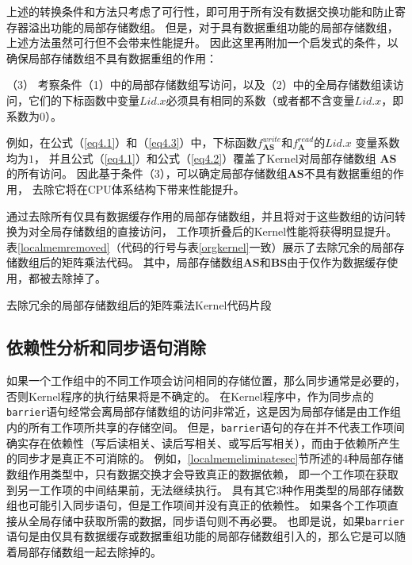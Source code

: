 上述的转换条件和方法只考虑了可行性，即可用于所有没有数据交换功能和防止寄存器溢出功能的局部存储数组。
但是，对于具有数据重组功能的局部存储数组，上述方法虽然可行但不会带来性能提升。
因此这里再附加一个启发式的条件，以确保局部存储数组不具有数据重组的作用：
\begin{compactitem}
\item[（3）]{考察条件（1）中的局部存储数组写访问，以及（2）中的全局存储数组读访问，它们的下标函数中变量$Lid.x$必须具有相同的系数（或者都不含变量$Lid.x$，即系数为$0$）。}
\end{compactitem}
例如，在公式（\ref{eq4.1}）和（\ref{eq4.3}）中，下标函数$f^{write}_{\bm{AS}}$和$f^{read}_{\bm{A}}$的$Lid.x$ 变量系数均为$1$，
并且公式（\ref{eq4.1}）和公式（\ref{eq4.2}）覆盖了Kernel对局部存储数组 $\bm{AS}$的所有访问。
因此基于条件（3），可以确定局部存储数组$\bm{AS}$不具有数据重组的作用，
去除它将在CPU体系结构下带来性能提升。

通过去除所有仅具有数据缓存作用的局部存储数组，并且将对于这些数组的访问转换为对全局存储数组的直接访问，
工作项折叠后的Kernel性能将获得明显提升。
表\ref{localmemremoved}（代码的行号与表\ref{orgkernel}一致）展示了去除冗余的局部存储数组后的矩阵乘法代码。
其中，局部存储数组$\bm{AS}$和$\bm{BS}$由于仅作为数据缓存使用，都被去除掉了。

\begin{table}[htb]
\centering
\caption{去除冗余的局部存储数组后的矩阵乘法Kernel代码片段}
\label{localmemremoved}
\end{table}

\subsection{依赖性分析和同步语句消除}
\label{dependenceanalysissec}
如果一个工作组中的不同工作项会访问相同的存储位置，那么同步通常是必要的，否则Kernel程序的执行结果将是不确定的。
在Kernel程序中，作为同步点的\texttt{barrier}语句经常会离局部存储数组的访问非常近，这是因为局部存储是由工作组内的所有工作项所共享的存储空间。
但是，\texttt{barrier}语句的存在并不代表工作项间确实存在依赖性（写后读相关、读后写相关、或写后写相关），而由于依赖所产生的同步才是真正不可消除的。
例如，\ref{localmemeliminatesec}节所述的4种局部存储数组作用类型中，只有数据交换才会导致真正的数据依赖，
即一个工作项在获取到另一工作项的中间结果前，无法继续执行。
具有其它3种作用类型的局部存储数组也可能引入同步语句，但是工作项间并没有真正的依赖性。
如果各个工作项直接从全局存储中获取所需的数据，同步语句则不再必要。
也即是说，如果\texttt{barrier}语句是由仅具有数据缓存或数据重组功能的局部存储数组引入的，那么它是可以随着局部存储数组一起去除掉的。

